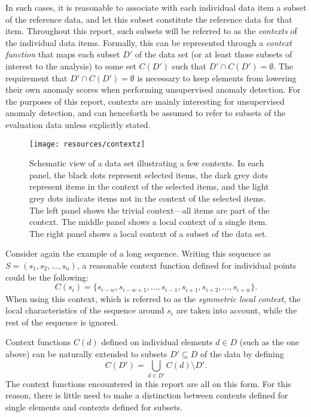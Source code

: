 In such cases, it is reasonable to associate with each individual data item a subset of the reference data, and let this subset constitute the reference data for that item. Throughout this report, such subsets will be referred to as the \emph{contexts} of the individual data items. Formally, this can be represented through a \emph{context function} that maps each subset $D'$ of the data set (or at least those subsets of interest to the analysis) to some set $C(D')$ such that $D' \cap C(D') = \emptyset$. The requirement that $D' \cap C(D') = \emptyset$ is necessary to keep elements from lowering their own anomaly scores when performing unsupervised anomaly detection. For the purposes of this report, contexts are mainly interesting for unsupervised anomaly detection, and can henceforth be assumed to refer to subsets of the evaluation data unless explicitly stated.

\begin{figure}[thb]
    \vspace{-4pt}
    \begin{center}
        \leavevmode
        \texttt{[image: resources/contextz]}
    \end{center}
    \vspace{-15pt}
    \caption{{\small Schematic view of a data set illustrating a few contexts. In each panel, the black dots represent selected items, the dark grey dots represent items in the context of the selected items, and the light grey dots indicate items not in the context of the selected items. The left panel shows the trivial context---all items are part of the context. The middle panel shows a local context of a single item. The right panel shows a local context of a subset of the data set.}}
    \label{fig:contexts}
    \vspace{-5pt}
\end{figure}

Consider again the example of a long sequence. Writing this sequence as $S = (s_1, s_2, \dots, s_n)$, a reasonable context function defined for individual points could be the following:
\[
    C(s_i) = \{s_{i-w}, s_{i - w + 1}, \dots, s_{i - 1}, s_{i + 1}, s_{i + 2}, \dots, s_{i + w}\}.
\]
When using this context, which is referred to as the \emph{symmetric local context}, the local characteristics of the sequence around $s_i$ are taken into account, while the rest of the sequence is ignored.

Context functions $C(d)$ defined on individual elements $d \in D$ (such as the one above) can be naturally extended to subsets $D' \subseteq D$ of the data by defining
\[
    C(D') = \bigcup_{d \in D'} C(d) \setminus D'.
\]
The context functions encountered in this report are all on this form. For this reason, there is little need to make a distinction between contexts defined for single elements and contexts defined for subsets.

